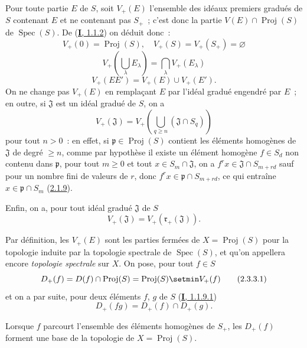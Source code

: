\begin{env}[2.3.2]
\label{II.2.3.2-fr}
Pour toute partie $E$ de $S$, soit $V_+(E)$ l'ensemble des idéaux premiers
gradués de $S$ contenant $E$ et ne contenant pas $S_+$~; c'est donc la
partie $V(E)\cap\operatorname{Proj}(S)$ de
$\operatorname{Spec}(S)$. De (\hyperref[I.1.1.2-fr]{\textbf{I}, 1.1.2}) on déduit
donc~:
\[
  \label{II.2.3.2.1-fr}
  V_+(0)=\operatorname{Proj}(S),\quad
  V_+(S)=V_+(S_+)=\varnothing
  \tag{2.3.2.1}
\]
\[
  \label{II.2.3.2.2-fr}
  V_+\left(\bigcup_\lambda E_\lambda\right)
  =\bigcap_\lambda V_+(E_\lambda)
  \tag{2.3.2.2}
\]
\[
  \label{II.2.3.2.3-fr}
  V_+(EE')=V_+(E)\cup V_+(E').
  \tag{2.3.2.3}
\]
On ne change pas $V_+(E)$ en remplaçant $E$ par l'idéal gradué engendré par
$E$~; en outre, si $\mathfrak{J}$ est un idéal gradué de $S$, on a
\[
  \label{II.2.3.2.4-fr}
  V_+(\mathfrak{J})
  =V_+\left(\bigcup_{q\geq n}(\mathfrak{J}\cap S_q)\right)
  \tag{2.3.2.4}
\]
pour tout $n>0$~: en effet, si
$\mathfrak{p}\in\operatorname{Proj}(S)$ contient les éléments homogènes de
$\mathfrak{J}$ de degré $\geq n$, comme par hypothèse il existe un élément
homogène $f\in S_d$ non contenu dans $\mathfrak{p}$, pour tout $m\geq 0$ et
tout $x\in S_m\cap\mathfrak{J}$, on a
$f^r x\in\mathfrak{J}\cap S_{m+rd}$ sauf pour un nombre fini de valeurs de
$r$, donc $f^r x\in\mathfrak{p}\cap S_{m+rd}$, ce qui entraîne
$x\in\mathfrak{p}\cap S_m$
(\hyperref[II.2.1.9-fr]{2.1.9}).

Enfin, on a, pour tout idéal gradué $\mathfrak{J}$ de $S$
\[
  \label{II.2.3.2.5-fr}
  V_+(\mathfrak{J})=V_+(\mathfrak{r}_+(\mathfrak{J})).
  \tag{2.3.2.5}
\]
\end{env}

\begin{env}[2.3.3]
\label{II.2.3.3-fr}
Par définition, les $V_+(E)$ sont les parties fermées de
$X=\operatorname{Proj}(S)$ pour la topologie induite par la topologie
spectrale de $\operatorname{Spec}(S)$, et qu'on appellera encore
\emph{topologie spectrale} sur $X$. On pose, pour tout $f\in S$
\[
  \label{II.2.3.3.1-fr}
  D_+(f)=D(f)\cap\operatorname{Proj}(S)
  =\operatorname{Proj}(S)\setmin V_+(f)
  \tag{2.3.3.1}
\]
et on a par suite, pour deux éléments $f$, $g$ de $S$
(\hyperref[I.1.1.9.1-fr]{\textbf{I}, 1.1.9.1})
\[
  \label{II.2.3.3.2-fr}
  D_+(fg)=D_+(f)\cap D_+(g).
  \tag{2.3.3.2}
\]
\end{env}

\begin{proposition}[2.3.4]
\label{II.2.3.4-fr}
Lorsque $f$ parcourt l'ensemble des éléments homogènes de $S_+$, les
$D_+(f)$ forment une base de la topologie de
$X=\operatorname{Proj}(S)$.
\end{proposition}


